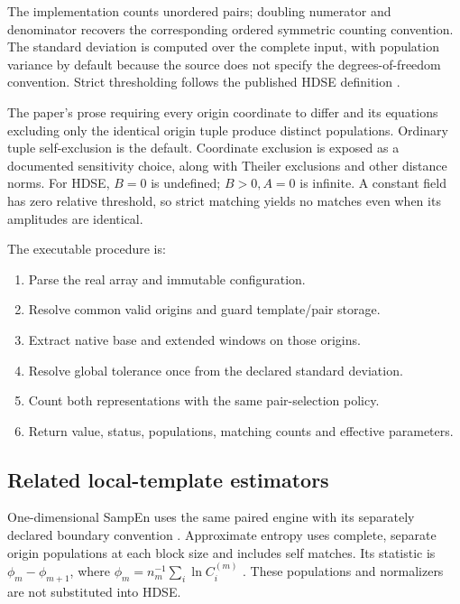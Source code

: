 \documentclass[
  english,
  11pt,
]{article}
\providecommand{\tightlist}{%
  \setlength{\itemsep}{0pt}\setlength{\parskip}{0pt}}
\begin{document}
The implementation counts unordered pairs; doubling numerator and
denominator recovers the corresponding ordered symmetric counting
convention. The standard deviation is computed over the complete input,
with population variance by default because the source does not specify
the degrees-of-freedom convention. Strict thresholding follows the
published HDSE definition \citep{xia2026hdse}.

The paper's prose requiring every origin coordinate to differ and its
equations excluding only the identical origin tuple produce distinct
populations. Ordinary tuple self-exclusion is the default. Coordinate
exclusion is exposed as a documented sensitivity choice, along with
Theiler exclusions and other distance norms. For HDSE, \(B=0\) is
undefined; \(B>0,A=0\) is infinite. A constant field has zero relative
threshold, so strict matching yields no matches even when its amplitudes
are identical.

The executable procedure is:

\begin{enumerate}
\def\labelenumi{\arabic{enumi}.}
\tightlist
\item
  Parse the real array and immutable configuration.
\item
  Resolve common valid origins and guard template/pair storage.
\item
  Extract native base and extended windows on those origins.
\item
  Resolve global tolerance once from the declared standard deviation.
\item
  Count both representations with the same pair-selection policy.
\item
  Return value, status, populations, matching counts and effective
  parameters.
\end{enumerate}

\subsection{Related local-template
estimators}\label{related-local-template-estimators}

One-dimensional SampEn uses the same paired engine with its separately
declared boundary convention \citep{richman2000}. Approximate entropy
uses complete, separate origin populations at each block size and
includes self matches. Its statistic is \(\phi_m-\phi_{m+1}\), where
\(\phi_m=n_m^{-1}\sum_i\ln C_i^{(m)}\) \citep{pincus1991}. These
populations and normalizers are not substituted into HDSE.
\end{document}
